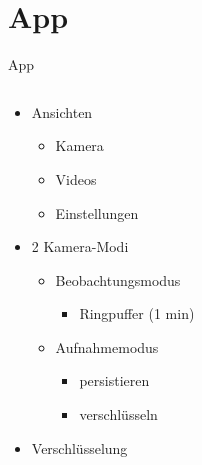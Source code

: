 \documentclass[19pt]{beamer}
\begin{document}
\section{App}
\begin{frame}{App}
  \begin{columns}[T]
    \begin{column}{.5\textwidth}
    		\begin{itemize}
    			\item Ansichten
			\begin{itemize}
				\item Kamera
				\item Videos
				\item Einstellungen
				\pause
			\end{itemize}
			\item 2 Kamera-Modi
			\begin{itemize}
				\item Beobachtungsmodus
				\begin{itemize}
					\item Ringpuffer (1 min)
				\end{itemize}
				\item Aufnahmemodus
				\begin{itemize}
					\item persistieren
					\item verschl\"usseln
				\end{itemize}
				\pause
			\end{itemize}
			\item Verschl\"usselung
    		\end{itemize}
    \end{column}
    \begin{column}{.5\textwidth}

\end{column}
\end{columns}
\end{frame}
\end{document}
